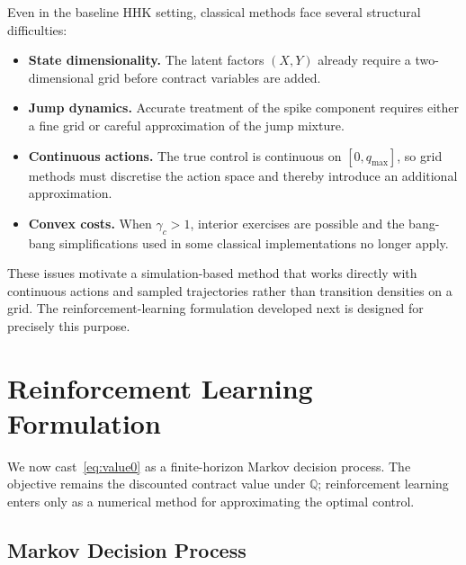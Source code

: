 \documentclass[a4paper,fleqn]{cas-dc}
\begin{document}
Even in the baseline HHK setting, classical methods face several structural difficulties:
\begin{itemize}
    \item \textbf{State dimensionality.} The latent factors $(X,Y)$ already require a two-dimensional grid before contract variables are added.
    \item \textbf{Jump dynamics.} Accurate treatment of the spike component requires either a fine grid or careful approximation of the jump mixture.
    \item \textbf{Continuous actions.} The true control is continuous on $[0,q_{\max}]$, so grid methods must discretise the action space and thereby introduce an additional approximation.
    \item \textbf{Convex costs.} When $\gamma_c > 1$, interior exercises are possible and the bang-bang simplifications used in some classical implementations no longer apply.
\end{itemize}

These issues motivate a simulation-based method that works directly with continuous actions and sampled trajectories rather than transition densities on a grid. The reinforcement-learning formulation developed next is designed for precisely this purpose.

\section{Reinforcement Learning Formulation}
\label{sec:rl_formulation}

We now cast~\eqref{eq:value0} as a finite-horizon Markov decision process. The objective remains the discounted contract value under $\mathbb{Q}$; reinforcement learning enters only as a numerical method for approximating the optimal control.

\subsection{Markov Decision Process}
\label{sec:mdp}
\end{document}
